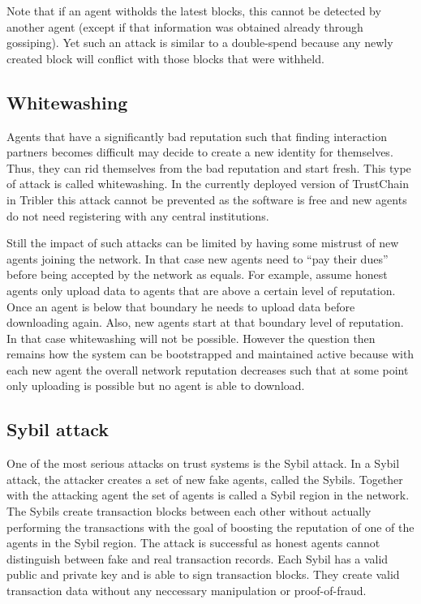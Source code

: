 Note that if an agent witholds the latest blocks, this cannot be detected by another agent (except
if that information was obtained already through gossiping). Yet such an attack is similar to a
double-spend because any newly created block will conflict with those blocks that were withheld.

\subsection{Whitewashing}
Agents that have a significantly bad reputation such that finding interaction partners becomes difficult may decide to create a new 
identity for themselves. Thus, they can rid themselves from the bad reputation and start fresh. This 
type of attack is called whitewashing. In the currently deployed version of TrustChain in Tribler 
this attack cannot be prevented as the software is free and new agents do not need registering with
any central institutions.

Still the impact of such attacks can be limited by having some mistrust of new agents joining the 
network. In that case new agents need to ``pay their dues'' before being accepted by the network 
as equals. For example, assume honest agents only upload data to agents that are above a certain level
of reputation. Once an agent is below that boundary he needs to upload data before downloading again.
Also, new agents start at that boundary level of reputation. In that case whitewashing will not be
possible. However the question then remains how the system can be bootstrapped and maintained
active because with each new agent the overall network reputation decreases such that at some point
only uploading is possible but no agent is able to download.

\subsection{Sybil attack}
One of the most serious attacks on trust systems is the Sybil attack. In a Sybil attack, the attacker
creates a set of new fake agents, called the Sybils. Together with the attacking agent the set of 
agents is called a Sybil region in the network. The Sybils create transaction blocks  
between each other without actually performing the transactions with the goal of boosting the 
reputation of one of the agents in the Sybil region. The attack is successful as honest agents 
cannot distinguish between fake and real transaction records. Each Sybil has a valid public and private
key and is able to sign transaction blocks. They create valid transaction data without any neccessary
manipulation or proof-of-fraud.

